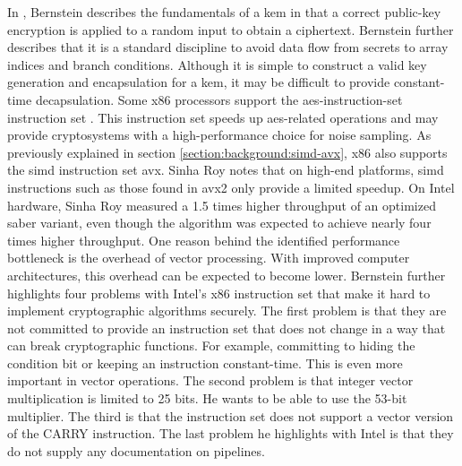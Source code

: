 In \cite{bernstein2018}, Bernstein describes the fundamentals of a \gls{kem} in that a correct public-key encryption is applied to a random input to obtain a ciphertext. Bernstein further describes that it is a standard discipline to avoid data flow from secrets to array indices and branch conditions. Although it is simple to construct a valid key generation and encapsulation for a \gls{kem}, it may be difficult to provide constant-time decapsulation.
Some \gls{x86} processors support the \gls{aes-instruction-set} instruction set \cite{alkim2016}. This instruction set speeds up \gls{aes}-related operations and may provide cryptosystems with a high-performance choice for noise sampling. As previously explained in section \ref{section:background:simd-avx}, \gls{x86} also supports the \gls{simd} instruction set \gls{avx}. Sinha Roy \cite{sinha2019} notes that on high-end platforms, \gls{simd} instructions such as those found in \gls{avx2} only provide a limited speedup. On Intel hardware, Sinha Roy measured a 1.5 times higher throughput of an optimized \gls{saber} variant, even though the algorithm was expected to achieve nearly four times higher throughput. One reason behind the identified performance bottleneck is the overhead of vector processing. With improved computer architectures, this overhead can be expected to become lower. Bernstein \cite{bernstein2014} further highlights four problems with Intel's \gls{x86} instruction set that make it hard to implement cryptographic algorithms securely. The first problem is that they are not committed to provide an instruction set that does not change in a way that can break cryptographic functions. For example, committing to hiding the condition bit or keeping an instruction constant-time. This is even more important in vector operations. The second problem is that integer vector multiplication is limited to 25 bits. He wants to be able to use the 53-bit multiplier. The third is that the instruction set does not support a vector version of the CARRY instruction. The last problem he highlights with Intel is that they do not supply any documentation on pipelines.


